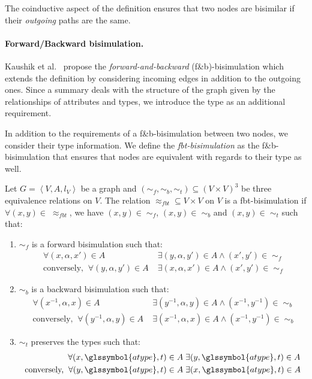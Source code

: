 The coinductive aspect of the definition ensures that two nodes are bisimilar if their \emph{outgoing} paths are the same.

\paragraph{Forward/Backward bisimulation.}

Kaushik et al.~\cite{kaushik:2002:cib} propose the \emph{forward-and-backward} (f\&b)-bisimulation which extends the definition by considering incoming edges in addition to the outgoing ones. Since a summary deals with the structure of the graph given by the relationships of \gls{attributes} and \gls{types}, we introduce the type as an additional requirement.

In addition to the requirements of a f\&b-bisimulation between two nodes, we consider their type information. We define the \emph{fbt-bisimulation} as the f\&b-bisimulation that ensures that nodes are equivalent with regards to their type as well.

\begin{definition}
Let $G=\left\langle V, A, l_V \right\rangle$ be a graph and $(\sim_f, \sim_b, \sim_t) \subseteq (V \times V)^3$ be three equivalence relations on $V$.
The relation $\approx_{fbt} \subseteq V \times V$ on $V$ is a fbt-bisimulation if $\forall (x,y) \in\; \approx_{fbt}$, we have $(x,y) \in\; \sim_f$, $(x,y) \in\; \sim_b$ and $(x,y) \in\; \sim_t$ such that:
\begin{enumerate}
\item $\sim_f$ is a forward bisimulation such that:
$$
\begin{aligned}
\forall (x, \alpha, x') \in A&\; \exists (y, \alpha, y') \in A \wedge (x',y') \in\; \sim_f \\
\text{conversely,}\;\; \forall (y, \alpha, y') \in A&\; \exists (x, \alpha, x') \in A \wedge (x',y') \in\; \sim_f
\end{aligned}
$$

\item $\sim_b$ is a backward bisimulation such that:
$$
\begin{aligned}
\forall (x^{-1}, \alpha, x) \in A&\; \exists (y^{-1}, \alpha, y) \in A \wedge (x^{-1}, y^{-1}) \in\; \sim_b \\
\text{conversely,}\;\; \forall (y^{-1}, \alpha, y) \in A&\; \exists (x^{-1}, \alpha, x) \in A \wedge (x^{-1}, y^{-1}) \in\; \sim_b
\end{aligned}
$$

\item $\sim_t$ preserves the types such that:
$$
\begin{aligned}
\forall (x, \glssymbol{atype}, t) \in A&\; \exists (y, \glssymbol{atype}, t) \in A \\
\text{conversely,}\;\; \forall (y, \glssymbol{atype}, t) \in A&\; \exists (x, \glssymbol{atype}, t) \in A
\end{aligned}
$$

\end{enumerate}
\end{definition}

